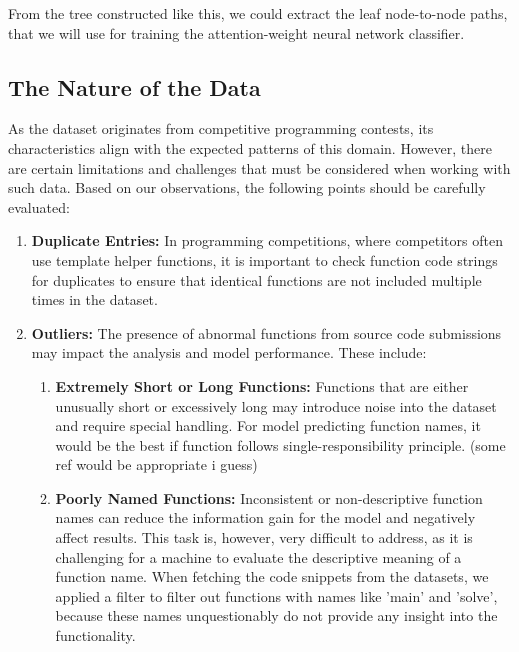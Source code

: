 \documentclass[10pt,english,a4paper]{report}
\begin{document}
From the tree constructed like this, we could extract the leaf node-to-node paths, that we will 
use for training the attention-weight neural network classifier.


\subsection{The Nature of the Data}
\label{item:nature_of_data}
As the dataset originates from competitive programming contests, its characteristics align with the expected patterns of this domain. However, there are certain limitations and challenges that must be considered when working with such data. Based on our observations, the following points should be carefully evaluated:

\begin{enumerate}
    \item \textbf{Duplicate Entries:}
    \label{item:duplicate_entries}
    In programming competitions, where competitors often use template
    helper functions, it is important to check function code strings
    for duplicates to ensure that identical functions are not included
    multiple times in the dataset.

    \item \textbf{Outliers:}
    \label{item:outliers}
    The presence of abnormal functions from source code submissions may impact the analysis and model performance. These include:
    \begin{enumerate}
        \item \textbf{Extremely Short or Long Functions:}
        \label{item:short_long_functions}
        Functions that are either unusually short or excessively long may introduce noise into the dataset and require special handling. For model predicting function names, it would be the best if function follows single-responsibility principle. (some ref would be appropriate i guess)
       
        \item \textbf{Poorly Named Functions:}
        \label{item:poorly_named_functions}
        Inconsistent or non-descriptive function names can reduce the information gain for the model and negatively affect results. This task is, however, very difficult to address, as it is challenging for a machine to evaluate the descriptive meaning of a function name. When fetching the code snippets from the datasets, we applied a filter to filter out functions with names like 'main' and 'solve', because these names unquestionably do not provide any insight into the functionality.


\end{enumerate}
\end{enumerate}
\end{document}

